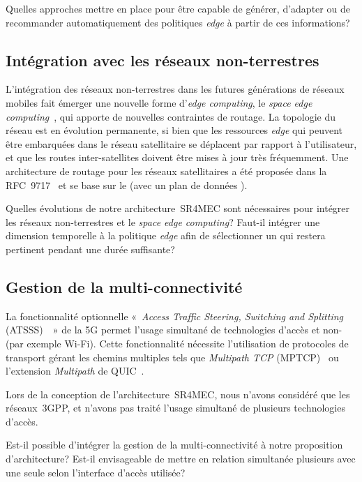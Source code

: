 \documentclass[../main.tex]{subfiles}
\begin{document}
Quelles approches mettre en place pour être capable de générer, d’adapter ou de recommander automatiquement des politiques \textit{edge} à partir de ces informations?

\subsection*{Intégration avec les réseaux non-terrestres}
L’intégration des réseaux non-terrestres dans les futures générations de réseaux mobiles fait émerger une nouvelle forme d’\textit{edge computing}, le \textit{space edge computing}~\cite{10.1109/COMST.2025.3579525}, qui apporte de nouvelles contraintes de routage.
La topologie du réseau est en évolution permanente, si bien que les ressources \textit{edge} qui peuvent être embarquées dans le réseau satellitaire se déplacent par rapport à l’utilisateur, et que les routes inter-satellites doivent être mises à jour très fréquemment.
Une architecture de routage pour les réseaux satellitaires a été proposée dans la RFC~9717~\cite{rfc9717} et se base sur le  (avec un plan de données ).

Quelles évolutions de notre architecture~SR4MEC sont nécessaires pour intégrer les réseaux non-terrestres et le \textit{space edge computing}?
Faut-il intégrer une dimension temporelle à la politique \textit{edge} afin de sélectionner un  qui restera pertinent pendant une durée suffisante?

\subsection*{Gestion de la multi-connectivité}

La fonctionnalité optionnelle «~\textit{Access Traffic Steering, Switching and Splitting} (ATSSS)~\cite{10.1109/APCC47188.2019.9026455,3GPP.TS.24.193}~» de la 5G permet l’usage simultané de technologies d’accès  et non- (par exemple Wi-Fi). 
Cette fonctionnalité nécessite l’utilisation de protocoles de transport gérant les chemins multiples tels que \textit{Multipath TCP} (MPTCP)~\cite{rfc8684} ou l’extension \textit{Multipath} de QUIC~\cite{rfc10069,10.1109/MCOMSTD.0006.2200056}.

Lors de la conception de l’architecture~SR4MEC, nous n’avons considéré que les réseaux~3GPP, et n’avons pas traité l’usage simultané de plusieurs technologies d’accès.

Est-il possible d’intégrer la gestion de la multi-connectivité à notre proposition d’architecture? Est-il envisageable de mettre en relation simultanée plusieurs  avec une seule  selon l’interface d’accès utilisée?
\end{document}
